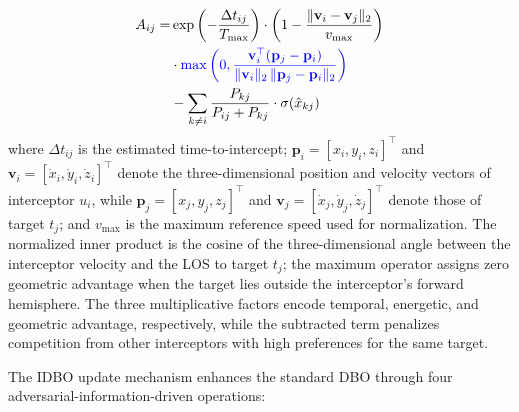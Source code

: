 \documentclass[lettersize,journal]{IEEEtran}
\newcommand{\hladd}[1]{{\color{blue}#1}}
\begin{document}
\begin{equation}
\label{eq:adversarial_advantage}
\begin{split}
A_{ij} =& \exp\left(-\frac{\Delta t_{ij}}{T_{\max}}\right) \cdot \left(1 - \frac{\|\mathbf{v}_i - \mathbf{v}_j\|_2}{v_{\max}}\right) \\
&\cdot \hladd{\max\left(0,
\frac{\mathbf{v}_i^{\top}(\mathbf{p}_j-\mathbf{p}_i)}
{\|\mathbf{v}_i\|_2\,\|\mathbf{p}_j-\mathbf{p}_i\|_2}\right)} \\
&- \sum_{k\neq i} \frac{P_{kj}}{P_{ij} + P_{kj}} \cdot \sigma(\hat{x}_{kj})
\end{split}
\end{equation}
where $\Delta t_{ij}$ is the estimated time-to-intercept; \hladd{$\mathbf{p}_i=[x_i,y_i,z_i]^\top$ and $\mathbf{v}_i=[\dot{x}_i,\dot{y}_i,\dot{z}_i]^\top$ denote the three-dimensional position and velocity vectors of interceptor $u_i$, while $\mathbf{p}_j=[x_j,y_j,z_j]^\top$ and $\mathbf{v}_j=[\dot{x}_j,\dot{y}_j,\dot{z}_j]^\top$ denote those of target $t_j$}; and $v_{\max}$ is the maximum reference speed used for normalization. \hladd{The normalized inner product is the cosine of the three-dimensional angle between the interceptor velocity and the LOS to target $t_j$; the maximum operator assigns zero geometric advantage when the target lies outside the interceptor's forward hemisphere.} The three multiplicative factors encode temporal, energetic, and geometric advantage, respectively, while the subtracted term penalizes competition from other interceptors with high preferences for the same target.

The IDBO update mechanism enhances the standard DBO through four adversarial-information-driven operations:
\end{document}
